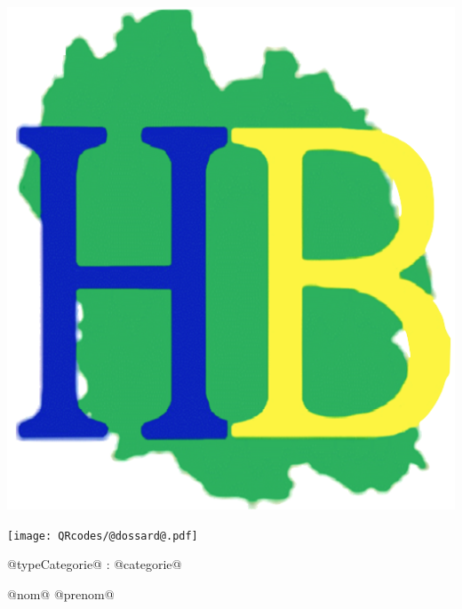 \Huge

\begin{block} %
{}\hfill {}
{}\hfill {}
\begin{minipage}{0.15\linewidth}
\includegraphics[width=\textwidth]{logo-HB.png}
\end{minipage}
{}\hfill {}



\begin{minipage}{0.48\linewidth}
\texttt{[image: QRcodes/@dossard@.pdf]}
\end{minipage}
\begin{minipage}{0.5\linewidth}
{}\hfill {}
{}\hfill {}
\end{minipage}


\vspace{0.5cm}
\begin{minipage}{0.47\linewidth}
@typeCategorie@ : @categorie@
\end{minipage}
\hfill {}
\begin{minipage}{0.5\linewidth}
@nom@ @prenom@
\end{minipage}
\hfill {}

\end{block}

\vfill


\vfill
